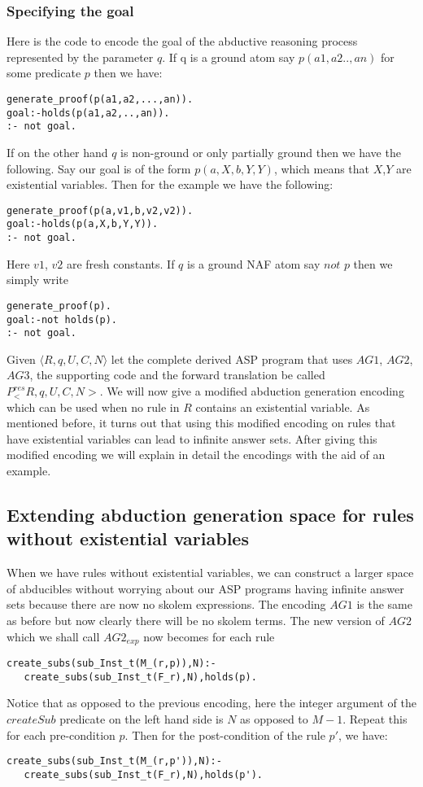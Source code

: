 \subsubsection{Specifying the goal}
Here is the code to encode the goal of the abductive reasoning process represented by the parameter $q$. If q is a ground atom say $p(a1,a2..,an)$ for some predicate $p$ then we
have:
\begin{lstlisting}[frame=none]
generate_proof(p(a1,a2,...,an)).
goal:-holds(p(a1,a2,..,an)).
:- not goal.
\end{lstlisting}
If on the other hand $q$ is non-ground or only partially ground then we have the following. Say our goal is of the form $p(a,X,b,Y,Y)$, which means that $X$,$Y$ are existential variables. Then for the example we have the following:
\begin{lstlisting}[frame=none]
generate_proof(p(a,v1,b,v2,v2)).
goal:-holds(p(a,X,b,Y,Y)).
:- not goal.
\end{lstlisting}
Here $v1$, $v2$ are fresh constants. If $q$ is a ground NAF atom say $\textit{not p}$ then we simply write 
\begin{lstlisting}[frame=none]
generate_proof(p).
goal:-not holds(p).
:- not goal.
\end{lstlisting}
Given $\langle R,q,U,C,N \rangle$ let the complete derived ASP program that uses $AG1$, $AG2$, $AG3$, the supporting code and the forward translation be called $P^{res}_<R,q,U,C,N>$. We will now give a modified abduction generation encoding which can be used when no rule in $R$ contains an existential variable. As mentioned before, it turns out that using this modified encoding on rules that have existential variables can lead to infinite answer sets. After giving this modified encoding we will explain in detail the encodings with the aid of an example. 
\subsection{Extending abduction generation space for rules without existential variables}
When we have rules without existential variables, we can construct a larger
space of abducibles without worrying about our ASP programs having infinite
answer sets because there are now no skolem expressions. The encoding $AG1$ is
the same as before but now clearly there will be no skolem terms. The new
version of $AG2$ which we shall call $AG2_{exp}$ now becomes for each rule 
\begin{lstlisting}[frame=none]
create_subs(sub_Inst_t(M_(r,p)),N):-
   create_subs(sub_Inst_t(F_r),N),holds(p).   
\end{lstlisting}
Notice that as opposed to the previous encoding, here the integer argument of the $createSub$ predicate on the left hand side is $N$ as opposed to $M-1$. Repeat this for each pre-condition $p$. Then for the post-condition of the rule $p'$, we have:
\begin{lstlisting}[frame=none]
create_subs(sub_Inst_t(M_(r,p')),N):-
   create_subs(sub_Inst_t(F_r),N),holds(p').   
\end{lstlisting}
 
